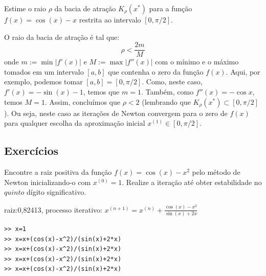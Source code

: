 \begin{ex}
\begin{ex}
  Estime o raio $\rho$ da bacia de atração $K_\rho(x^*)$ para a função $f(x) = \cos(x) - x$ restrita ao intervalo $[0, \pi/2]$.
\end{ex}
\begin{sol}
  O raio da bacia de atração é tal que:
  \begin{equation}
    \rho < \frac{2m}{M}
  \end{equation}
onde $m := \min |f'(x)|$ e $M := \max |f''(x)|$ com o mínimo e o máximo tomados em um intervalo $[a, b]$ que contenha o zero da função $f(x)$. Aqui, por exemplo, podemos tomar $[a, b] = [0, \pi/2]$. Como, neste caso, $f'(x) = -\sin(x) - 1$, temos que $m = 1$. Também, como $f''(x) = -\cos x$, temos $M = 1$. Assim, concluímos que $\rho < 2$ (lembrando que $K_\rho(x^*)\subset [0, \pi/2]$). Ou seja, neste caso as iterações de Newton convergem para o zero de $f(x)$ para qualquer escolha da aproximação inicial $x^{(1)}\in [0, \pi/2]$.
\end{sol}

\subsection*{Exercícios}

\begin{exer}\label{1d:cosx2}
Encontre a raiz positiva da função $f(x)=\cos(x)-x^2$ pelo método de Newton inicializando-o com $x^{(0)}=1$. Realize a iteração até obter estabilidade no $quinto$ dígito significativo.
\end{exer}
\begin{resp}
  raiz:0,82413, processo iterativo: $x^{(n+1)}= x^{(n)}+ \frac{\cos(x)-x^2}{\sin(x)+2x}$

\begin{verbatim}
>> x=1
>> x=x+(cos(x)-x^2)/(sin(x)+2*x)
>> x=x+(cos(x)-x^2)/(sin(x)+2*x)
>> x=x+(cos(x)-x^2)/(sin(x)+2*x)
>> x=x+(cos(x)-x^2)/(sin(x)+2*x)
\end{verbatim}
\end{resp}


\end{ex}

